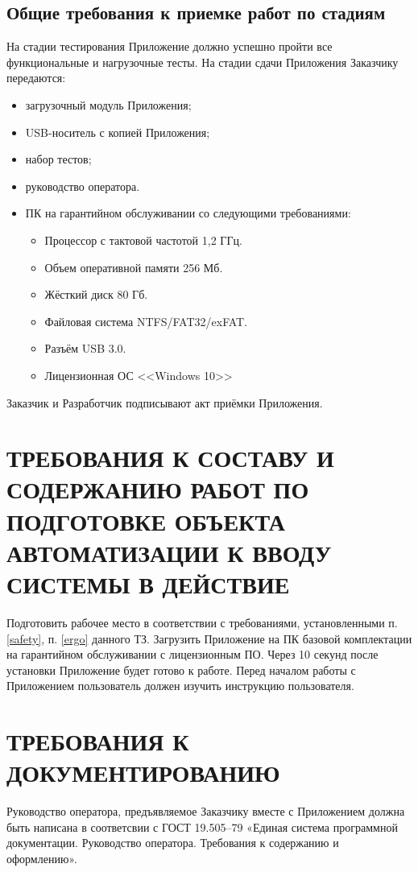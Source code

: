 \documentclass[12pt,a4paper]{article}
\begin{document}
\subsection{Общие требования к приемке работ по стадиям}
На стадии тестирования Приложение должно успешно пройти все функциональные и нагрузочные тесты. \newline
На стадии сдачи Приложения Заказчику передаются:
\begin{itemize}
    \item загрузочный модуль Приложения;
    \item USB-носитель с копией Приложения;
    \item набор тестов;
    \item руководство оператора.
    \item ПК на гарантийном обслуживании со следующими требованиями:
    \begin{itemize}
        \item Процессор с тактовой частотой 1,2 ГГц.
        \item Объем оперативной памяти 256 Мб.
        \item Жёсткий диск 80 Гб.
        \item Файловая система NTFS/FAT32/exFAT.
        \item Разъём USB 3.0.
        \item Лицензионная ОС <<Windows 10>>
    \end{itemize}
\end{itemize}
Заказчик и Разработчик подписывают акт приёмки Приложения.

\newpage
\section{ТРЕБОВАНИЯ К СОСТАВУ И СОДЕРЖАНИЮ РАБОТ ПО ПОДГОТОВКЕ ОБЪЕКТА АВТОМАТИЗАЦИИ К ВВОДУ СИСТЕМЫ В ДЕЙСТВИЕ}
Подготовить рабочее место в соответствии с требованиями, установленными п. \ref{safety}, п. \ref{ergo} 
данного ТЗ. Загрузить Приложение на ПК базовой комплектации на гарантийном обслуживании с лицензионным ПО. 
Через 10 секунд после установки Приложение будет готово к работе.\newline
Перед началом работы с Приложением пользователь должен изучить инструкцию пользователя.
\newpage
\section{ТРЕБОВАНИЯ К ДОКУМЕНТИРОВАНИЮ} \label{doc}
Руководство оператора, предъявляемое Заказчику вместе с Приложением должна быть написана в соответсвии с ГОСТ 19.505–79 «Единая система программной документации. Руководство оператора. Требования к содержанию и оформлению».
\newpage
\end{document}
